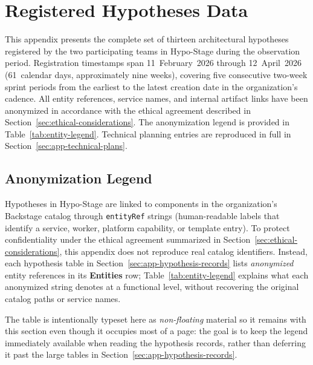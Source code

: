 

\chapter{Registered Hypotheses Data}
\label{app:hypotheses-data}

This appendix presents the complete set of thirteen architectural hypotheses
registered by the two participating teams in Hypo-Stage during the observation
period. Registration timestamps span 11~February~2026 through 12~April~2026 (61~calendar days, approximately nine weeks), covering five consecutive two-week sprint periods from the earliest to the latest creation date in the organization's cadence. All entity references, service names, and internal artifact links have
been anonymized in accordance with the ethical agreement described in
Section~\ref{sec:ethical-considerations}. The anonymization legend is provided
in Table~\ref{tab:entity-legend}. Technical planning entries are reproduced in
full in Section~\ref{sec:app-technical-plans}.

\section{Anonymization Legend}
\label{sec:app-legend}

Hypotheses in Hypo-Stage are linked to components in the organization's Backstage
catalog through \texttt{entityRef} strings (human-readable labels that identify a
service, worker, platform capability, or template entry). To protect confidentiality
under the ethical agreement summarized in Section~\ref{sec:ethical-considerations},
this appendix does not reproduce real catalog identifiers. Instead, each hypothesis
table in Section~\ref{sec:app-hypothesis-records} lists \emph{anonymized} entity
references in its \textbf{Entities} row; Table~\ref{tab:entity-legend} explains what
each anonymized string denotes at a functional level, without recovering the original
catalog paths or service names.

The table is intentionally typeset here as \emph{non-floating} material so it remains
with this section even though it occupies most of a page: the goal is to keep the
legend immediately available when reading the hypothesis records, rather than
deferring it past the large tables in Section~\ref{sec:app-hypothesis-records}.

